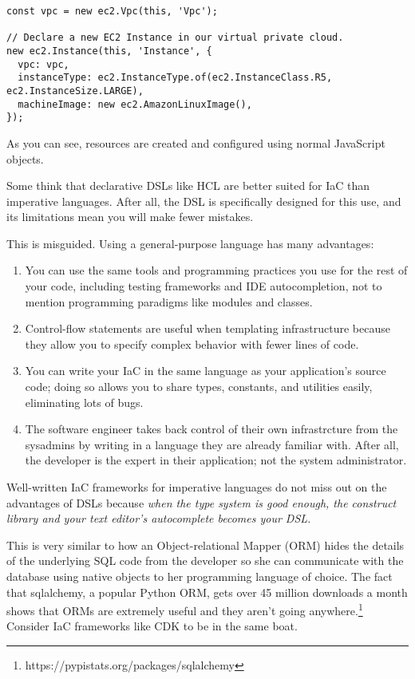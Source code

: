 \documentclass{article}
\begin{document}
\begin{verbatim}
const vpc = new ec2.Vpc(this, 'Vpc');

// Declare a new EC2 Instance in our virtual private cloud.
new ec2.Instance(this, 'Instance', {
  vpc: vpc,
  instanceType: ec2.InstanceType.of(ec2.InstanceClass.R5, ec2.InstanceSize.LARGE),
  machineImage: new ec2.AmazonLinuxImage(),
});
\end{verbatim}

As you can see, resources are created and configured using normal JavaScript objects.

Some think that declarative DSLs like HCL are better suited for IaC than imperative languages.
After all, the DSL is specifically designed for this use, and its limitations mean you will make fewer mistakes.

This is misguided.
Using a general-purpose language has many advantages:

\begin{enumerate}
  \item You can use the same tools and programming practices you use for the rest of your code, including testing frameworks and IDE autocompletion, not to mention programming paradigms like modules and classes.
  \item Control-flow statements are useful when templating infrastructure because they allow you to specify complex behavior with fewer lines of code.
  \item You can write your IaC in the same language as your application's source code; doing so allows you to share types, constants, and utilities easily, eliminating lots of bugs.
  \item The software engineer takes back control of their own infrastrcture from the sysadmins by writing in a language they are already familiar with.
    After all, the developer is the expert in their application; not the system administrator.
\end{enumerate}

Well-written IaC frameworks for imperative languages do not miss out on the advantages of DSLs because \textit{when the type system is good enough, the construct library and your text editor's autocomplete becomes your DSL.}

This is very similar to how an Object-relational Mapper (ORM) hides the details of the underlying SQL code from the developer so she can communicate with the database using native objects to her programming language of choice.
The fact that sqlalchemy, a popular Python ORM, gets over 45 million downloads a month shows that ORMs are extremely useful and they aren't going anywhere.\footnote{https://pypistats.org/packages/sqlalchemy}
Consider IaC frameworks like CDK to be in the same boat.
\end{document}
